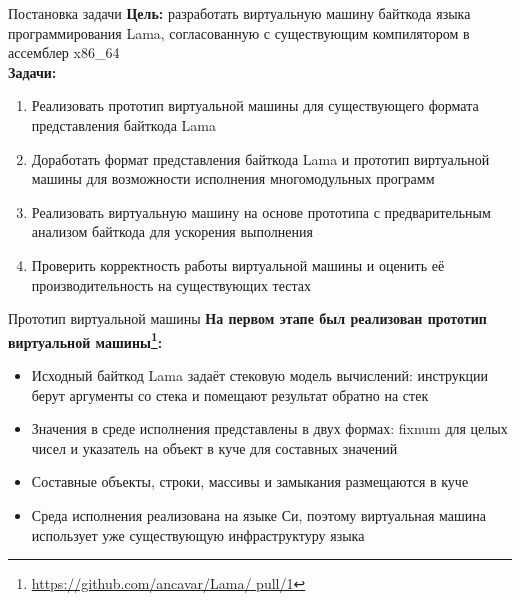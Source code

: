 \documentclass
  [ russian
  , aspectratio=1610
  ] {beamer}
\begin{document}
\begin{frame}{Постановка задачи}
  \textbf{Цель:} разработать виртуальную машину байткода языка программирования Lama, согласованную с существующим компилятором в ассемблер x86\_64 \\
    \textbf{Задачи:}
\begin{enumerate}
    \item Реализовать прототип виртуальной машины для существующего формата представления байткода Lama
    \item Доработать формат представления байткода Lama и прототип виртуальной машины для возможности исполнения многомодульных программ

    \item Реализовать виртуальную машину на основе прототипа с предварительным анализом байткода для ускорения выполнения    
    \item Проверить корректность работы виртуальной машины и оценить её производительность на существующих тестах
  \end{enumerate}
\end{frame}


\begin{frame}{Прототип виртуальной машины}
 \textbf{На первом этапе был реализован прототип виртуальной машины\footnote[frame]{\url{https://github.com/ancavar/Lama/
  pull/1}}:}
  \begin{itemize}
    \item Исходный байткод Lama задаёт стековую модель вычислений: инструкции берут аргументы со стека и помещают результат обратно на стек
    \item Значения в среде исполнения представлены в двух формах: fixnum для целых чисел и указатель
      на объект в куче для составных значений
    \item Составные объекты, строки, массивы и замыкания размещаются в куче
    \item Среда исполнения реализована на языке Си, поэтому виртуальная машина использует уже
      существующую инфраструктуру языка
  \end{itemize}

\end{frame}
\end{document}
